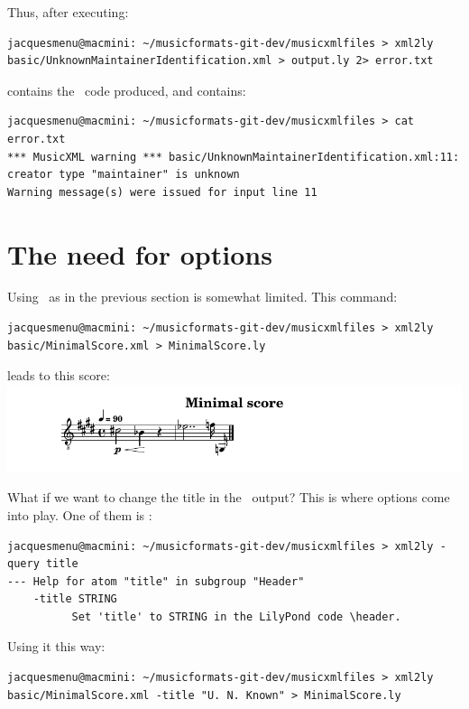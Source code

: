Thus, after executing:
\begin{lstlisting}[language=Terminal]
jacquesmenu@macmini: ~/musicformats-git-dev/musicxmlfiles > xml2ly basic/UnknownMaintainerIdentification.xml > output.ly 2> error.txt
\end{lstlisting}

 contains the \lily\ code produced, and  contains:
\begin{lstlisting}[language=Terminal]
jacquesmenu@macmini: ~/musicformats-git-dev/musicxmlfiles > cat error.txt
*** MusicXML warning *** basic/UnknownMaintainerIdentification.xml:11: creator type "maintainer" is unknown
Warning message(s) were issued for input line 11
\end{lstlisting}


\section{The need for options}

Using \xmlToLy\ as in the previous section is somewhat limited. This command:
\begin{lstlisting}[language=Terminal]
jacquesmenu@macmini: ~/musicformats-git-dev/musicxmlfiles > xml2ly basic/MinimalScore.xml > MinimalScore.ly
\end{lstlisting}

leads to this score:\\
\includegraphics[scale=0.7]{../graphics/MinimalScore.png}

What if we want to change the title in the \lily\ output? This is where options come into play. One of them is :
\begin{lstlisting}[language=Terminal]
jacquesmenu@macmini: ~/musicformats-git-dev/musicxmlfiles > xml2ly -query title
--- Help for atom "title" in subgroup "Header"
    -title STRING
          Set 'title' to STRING in the LilyPond code \header.
\end{lstlisting}

Using it this way:
\begin{lstlisting}[language=Terminal]
jacquesmenu@macmini: ~/musicformats-git-dev/musicxmlfiles > xml2ly basic/MinimalScore.xml -title "U. N. Known" > MinimalScore.ly
\end{lstlisting}


